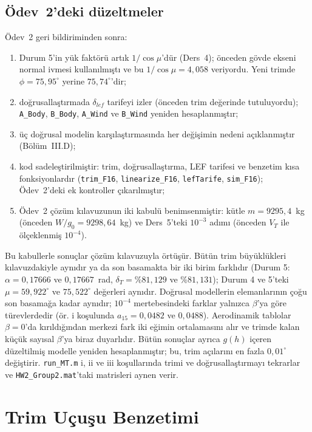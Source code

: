 \documentclass[conf]{new-aiaa}
\begin{document}
\subsection{Ödev~2'deki düzeltmeler}
Ödev~2 geri bildiriminden sonra:
\begin{enumerate}
\item Durum 5'in yük faktörü artık $1/\cos\mu$'dür (Ders~4); önceden gövde ekseni normal ivmesi kullanılmıştı ve bu $1/\cos\mu=4,058$ veriyordu. Yeni trimde $\phi=75,95^\circ$ yerine $75,74^\circ$'dir;
\item doğrusallaştırmada $\delta_{lef}$ tarifeyi izler (önceden trim değerinde tutuluyordu); \texttt{A\_Body}, \texttt{B\_Body}, \texttt{A\_Wind} ve \texttt{B\_Wind} yeniden hesaplanmıştır;
\item üç doğrusal modelin karşılaştırmasında her değişimin nedeni açıklanmıştır (Bölüm~III.D);
\item kod sadeleştirilmiştir: trim, doğrusallaştırma, LEF tarifesi ve benzetim kısa fonksiyonlardır (\texttt{trim\_F16}, \texttt{linearize\_F16}, \texttt{lefTarife}, \texttt{sim\_F16}); Ödev~2'deki ek kontroller çıkarılmıştır;
\item Ödev~2 çözüm kılavuzunun iki kabulü benimsenmiştir: kütle $m=9295,4$~kg (önceden $W/g_0=9298,64$~kg) ve Ders~5'teki $10^{-3}$ adımı (önceden $V_T$ ile ölçeklenmiş $10^{-4}$).
\end{enumerate}
Bu kabullerle sonuçlar çözüm kılavuzuyla örtüşür. Bütün trim büyüklükleri kılavuzdakiyle aynıdır ya da son basamakta bir iki birim farklıdır (Durum 5: $\alpha=0,17666$ ve $0,17667$~rad, $\delta_T=\%81,129$ ve $\%81,131$); Durum 4 ve 5'teki $\mu=59,922^\circ$ ve $75,522^\circ$ değerleri aynıdır. Doğrusal modellerin elemanlarının çoğu son basamağa kadar aynıdır; $10^{-4}$ mertebesindeki farklar yalnızca $\beta$'ya göre türevlerdedir (ör. i koşulunda $a_{15}=0,0482$ ve $0,0488$). Aerodinamik tablolar $\beta=0$'da kırıldığından merkezi fark iki eğimin ortalamasını alır ve trimde kalan küçük sayısal $\beta$'ya biraz duyarlıdır. Bütün sonuçlar ayrıca $g(h)$ içeren düzeltilmiş modelle yeniden hesaplanmıştır; bu, trim açılarını en fazla $0,01^\circ$ değiştirir. \texttt{run\_MT.m} i, ii ve iii koşullarında trimi ve doğrusallaştırmayı tekrarlar ve \texttt{HW2\_Group2.mat}'taki matrisleri aynen verir.

\section{Trim Uçuşu Benzetimi}
\end{document}
